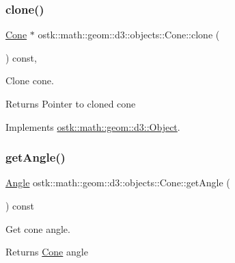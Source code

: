 \subsubsection{\texorpdfstring{clone()}{clone()}}
{\footnotesize\ttfamily \hyperlink{classostk_1_1math_1_1geom_1_1d3_1_1objects_1_1_cone}{Cone} $\ast$ ostk\+::math\+::geom\+::d3\+::objects\+::\+Cone\+::clone (\begin{DoxyParamCaption}{ }\end{DoxyParamCaption}) const\hspace{0.3cm}{\ttfamily [override]}, {\ttfamily [virtual]}}



Clone cone. 

\begin{DoxyReturn}{Returns}
Pointer to cloned cone 
\end{DoxyReturn}


Implements \hyperlink{classostk_1_1math_1_1geom_1_1d3_1_1_object_a676013f9555f6492687f9809b2db887b}{ostk\+::math\+::geom\+::d3\+::\+Object}.

\mbox{\label{classostk_1_1math_1_1geom_1_1d3_1_1objects_1_1_cone_ac288545383fe1514951ce13f1e7611f3}} 
\subsubsection{\texorpdfstring{get\+Angle()}{getAngle()}}
{\footnotesize\ttfamily \hyperlink{classostk_1_1math_1_1geom_1_1_angle}{Angle} ostk\+::math\+::geom\+::d3\+::objects\+::\+Cone\+::get\+Angle (\begin{DoxyParamCaption}{ }\end{DoxyParamCaption}) const}



Get cone angle. 

\begin{DoxyReturn}{Returns}
\hyperlink{classostk_1_1math_1_1geom_1_1d3_1_1objects_1_1_cone}{Cone} angle 
\end{DoxyReturn}
\mbox{\label{classostk_1_1math_1_1geom_1_1d3_1_1objects_1_1_cone_acc452d4c78df49bf3f15c840d6e15c1f}} 

